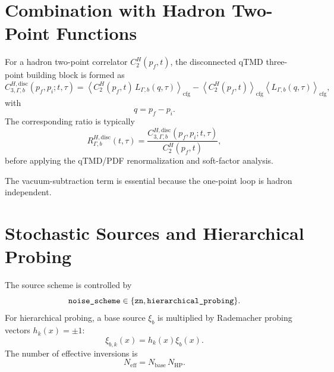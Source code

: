 \documentclass[11pt,a4paper]{article}
\newcommand{\code}[1]{\texttt{\begingroup\def\_{\textunderscore\allowbreak}#1\endgroup}}
\begin{document}
\section{Combination with Hadron Two-Point Functions}

For a hadron two-point correlator \(C_2^H(p_f,t)\), the disconnected qTMD
three-point building block is formed as
\begin{equation}
  C^{H,\mathrm{disc}}_{3,\Gamma,b}
  (p_f,p_i;t,\tau)
  =
  \left\langle
    C_2^H(p_f,t)\,
    L_{\Gamma,b}(q,\tau)
  \right\rangle_{\mathrm{cfg}}
  -
  \left\langle C_2^H(p_f,t)\right\rangle_{\mathrm{cfg}}
  \left\langle L_{\Gamma,b}(q,\tau)\right\rangle_{\mathrm{cfg}},
\end{equation}
with
\begin{equation}
  q = p_f - p_i.
\end{equation}
The corresponding ratio is typically
\begin{equation}
  R^{H,\mathrm{disc}}_{\Gamma,b}(t,\tau)
  =
  \frac{
    C^{H,\mathrm{disc}}_{3,\Gamma,b}(p_f,p_i;t,\tau)
  }{
    C_2^H(p_f,t)
  },
\end{equation}
before applying the qTMD/PDF renormalization and soft-factor analysis.

The vacuum-subtraction term is essential because the one-point loop is hadron
independent.

\section{Stochastic Sources and Hierarchical Probing}

The source scheme is controlled by
\begin{equation}
  \code{noise\_scheme}
  \in
  \{\code{zn},\code{hierarchical\_probing}\}.
\end{equation}
For hierarchical probing, a base source \(\xi_b\) is multiplied by Rademacher
probing vectors \(h_k(x)=\pm 1\):
\begin{equation}
  \xi_{b,k}(x) = h_k(x)\xi_b(x).
\end{equation}
The number of effective inversions is
\begin{equation}
  N_{\mathrm{eff}}
  =
  N_{\mathrm{base}}\,
  N_{\mathrm{HP}}.
\end{equation}
\end{document}
